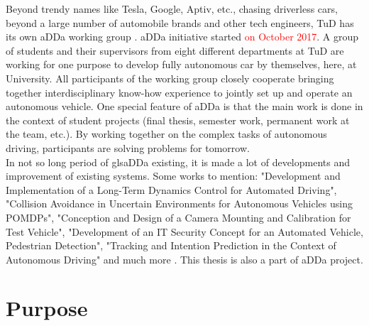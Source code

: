 Beyond trendy names like Tesla, Google, Aptiv, etc., chasing driverless cars, beyond a large number of automobile brands and other tech engineers, \gls{TuD} has its own \gls{aDDa} working group \cite{aDDa}. \gls{aDDa} initiative started \textcolor{red}{on October 2017}. A group of students and their supervisors from eight different departments at \gls{TuD} are working for one purpose to develop fully autonomous car by themselves, here, at University. All participants of the working group closely cooperate bringing together interdisciplinary know-how experience to jointly set up and operate an autonomous vehicle. One special feature of \gls{aDDa} is that the main work is done in the context of student projects (final thesis, semester work, permanent work at the team, etc.). By working together on the complex tasks of autonomous driving, participants are solving problems for tomorrow. \\
In not so long period of gls{aDDa} existing, it is made a lot of developments and improvement of existing systems. Some works to mention: "Development and Implementation of a Long-Term Dynamics Control for Automated Driving", "Collision Avoidance in Uncertain Environments for Autonomous Vehicles using POMDPs", "Conception and Design of a Camera Mounting and Calibration for Test Vehicle", "Development of an IT Security Concept for an Automated Vehicle, Pedestrian Detection", "Tracking and Intention Prediction in the Context of Autonomous Driving" and much more \textcolor{red}{\cite{aDDa}}. This thesis is also a part of \gls{aDDa} project.

\section{Purpose}


